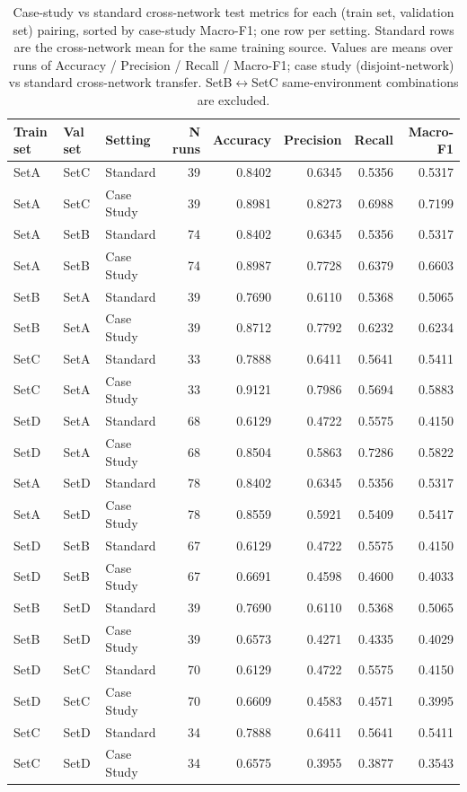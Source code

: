 \begin{table}
\caption{Case-study vs standard cross-network test metrics for each (train set, validation set) pairing, sorted by case-study Macro-F1; one row per setting. Standard rows are the cross-network mean for the same training source. Values are means over runs of Accuracy / Precision / Recall / Macro-F1; case study (disjoint-network) vs standard cross-network transfer. SetB$\leftrightarrow$SetC same-environment combinations are excluded.}
\label{tab:q5_appendix_pairing}
\begin{tabular}{lllrrrrr}
\toprule
Train set & Val set & Setting & N runs & Accuracy & Precision & Recall & Macro-F1 \\
\midrule
SetA & SetC & Standard & 39 & 0.8402 & 0.6345 & 0.5356 & 0.5317 \\
SetA & SetC & Case Study & 39 & 0.8981 & 0.8273 & 0.6988 & 0.7199 \\
SetA & SetB & Standard & 74 & 0.8402 & 0.6345 & 0.5356 & 0.5317 \\
SetA & SetB & Case Study & 74 & 0.8987 & 0.7728 & 0.6379 & 0.6603 \\
SetB & SetA & Standard & 39 & 0.7690 & 0.6110 & 0.5368 & 0.5065 \\
SetB & SetA & Case Study & 39 & 0.8712 & 0.7792 & 0.6232 & 0.6234 \\
SetC & SetA & Standard & 33 & 0.7888 & 0.6411 & 0.5641 & 0.5411 \\
SetC & SetA & Case Study & 33 & 0.9121 & 0.7986 & 0.5694 & 0.5883 \\
SetD & SetA & Standard & 68 & 0.6129 & 0.4722 & 0.5575 & 0.4150 \\
SetD & SetA & Case Study & 68 & 0.8504 & 0.5863 & 0.7286 & 0.5822 \\
SetA & SetD & Standard & 78 & 0.8402 & 0.6345 & 0.5356 & 0.5317 \\
SetA & SetD & Case Study & 78 & 0.8559 & 0.5921 & 0.5409 & 0.5417 \\
SetD & SetB & Standard & 67 & 0.6129 & 0.4722 & 0.5575 & 0.4150 \\
SetD & SetB & Case Study & 67 & 0.6691 & 0.4598 & 0.4600 & 0.4033 \\
SetB & SetD & Standard & 39 & 0.7690 & 0.6110 & 0.5368 & 0.5065 \\
SetB & SetD & Case Study & 39 & 0.6573 & 0.4271 & 0.4335 & 0.4029 \\
SetD & SetC & Standard & 70 & 0.6129 & 0.4722 & 0.5575 & 0.4150 \\
SetD & SetC & Case Study & 70 & 0.6609 & 0.4583 & 0.4571 & 0.3995 \\
SetC & SetD & Standard & 34 & 0.7888 & 0.6411 & 0.5641 & 0.5411 \\
SetC & SetD & Case Study & 34 & 0.6575 & 0.3955 & 0.3877 & 0.3543 \\
\bottomrule
\end{tabular}
\end{table}
